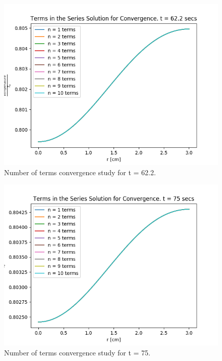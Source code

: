 \documentclass[12pt,letterpaper]{article}
\begin{document}
\begin{figure}[htbp!]
  \begin{center}
    \includegraphics[scale=0.7]{terms_622.png}
  \end{center}
  \caption{Number of terms convergence study for t = 62.2.}
  \label{fig:62}
\end{figure}

\begin{figure}[htbp!]
  \begin{center}
    \includegraphics[scale=0.7]{terms_75.png}
  \end{center}
  \caption{Number of terms convergence study for t = 75.}
  \label{fig:75}
\end{figure}
\end{document}
